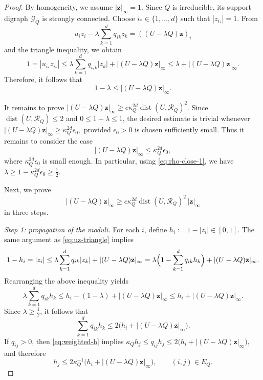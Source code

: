 \documentclass[11pt,twoside, a4paper]{article}
\numberwithin{equation}{section}
\numberwithin{figure}{section}
\theoremstyle{plain} %
\theoremstyle{definition}
\theoremstyle{remark}
\newcommand{\1} {\mspace{1 mu}}
\newcommand{\2} {\mspace{2 mu}}
\DeclareMathOperator{\dist}{dist}
\begin{document}
\begin{proof}
By homogeneity, we assume \(|\mathbf z|_\infty=1.\)
Since \(Q\) is irreducible, its support digraph $\mathcal{G}_Q$ is strongly connected. Choose \(i_*\in\{1,\dots,d\}\) such that
$
|z_{i_*}|=1.
$
From
\[
u_i z_i-\lambda\sum_{k=1}^d q_{ik}z_k=((U-\lambda Q)\mathbf z)_i
\]
and the triangle inequality, we obtain
\begin{equation}\label{eq:uz-triangle}
  1=|u_{i_*}z_{i_*}|
\le \lambda\sum_{k=1}^d q_{i_*k}|z_k|+|(U-\lambda Q)\mathbf z|_\infty
\le \lambda+|(U-\lambda Q)\mathbf z|_\infty.
\end{equation}
Therefore, it follows that
\begin{equation}\label{eq:rho-close-1}
1-\lambda\le |(U-\lambda Q)\mathbf z|_\infty.
\end{equation}


It remains to prove $|(U-\lambda Q)\mathbf z|_\infty\ge c\kappa_Q^{2d}\dist(U,\mathscr{R}_Q)^2$.
Since \(\dist(U,\mathscr{R}_Q)\le 2\) and \(0\le 1-\lambda\le 1\), the desired estimate is trivial whenever
$
|(U-\lambda Q)\mathbf z|_\infty\ge \kappa_Q^{2d}\epsilon_0,
$
provided \(\epsilon_0>0\) is chosen sufficiently small. Thus it remains to consider the case
\begin{equation}\label{eq:small-epsilon-graph}
|(U-\lambda Q)\mathbf z|_\infty\le \kappa_Q^{2d}\epsilon_0,
\end{equation}
where $\kappa_Q^{2d}\epsilon_0$ is small enough.
In particular, using \eqref{eq:rho-close-1}, we have
$
\lambda\ge 1-\kappa_Q^{2d}\epsilon_0\ge \frac12.
$

Next, we prove
\[
|(U-\lambda Q)\mathbf z|_\infty
\ge c\kappa_Q^{2d}\dist(U,\mathscr{R}_Q)^2\,|\mathbf z|_\infty
\]
in three steps.

\medskip
\noindent\textit{Step 1: propagation of the moduli.}
For each \(i\), define
$
h_i:=1-|z_i|\in[0,1].
$
The same argument as \eqref{eq:uz-triangle} implies
\[
1-h_i=|z_i|
\le \lambda\sum_{k=1}^d q_{ik}|z_k|+|(U-\lambda Q)\mathbf z|_\infty
=\lambda\Bigl(1-\sum_{k=1}^d q_{ik}h_k\Bigr)+|(U-\lambda Q)\mathbf z|_\infty.
\]
Rearranging the above inequality yields
\[
\lambda\sum_{k=1}^d q_{ik}h_k
\le h_i-(1-\lambda)+|(U-\lambda Q)\mathbf z|_\infty
\le h_i+|(U-\lambda Q)\mathbf z|_\infty.
\]
Since \(\lambda\ge \frac12\), it follows that
\begin{equation}\label{eq:weighted-h}
\sum_{k=1}^d q_{ik}h_k\le 2\bigl(h_i+|(U-\lambda Q)\mathbf z|_\infty\bigr).
\end{equation}
If \(q_{ij}>0\), then \eqref{eq:weighted-h} implies
$
\kappa_Q h_j\le q_{ij}h_j\le 2\bigl(h_i+|(U-\lambda Q)\mathbf z|_\infty\bigr),
$
and therefore
\begin{equation}\label{eq:edge-h-bound}
h_j\le 2\kappa_Q^{-1}\bigl(h_i+|(U-\lambda Q)\mathbf z|_\infty\bigr),
\qquad(i,j)\in E_Q.
\end{equation}


\end{proof}
\end{document}
